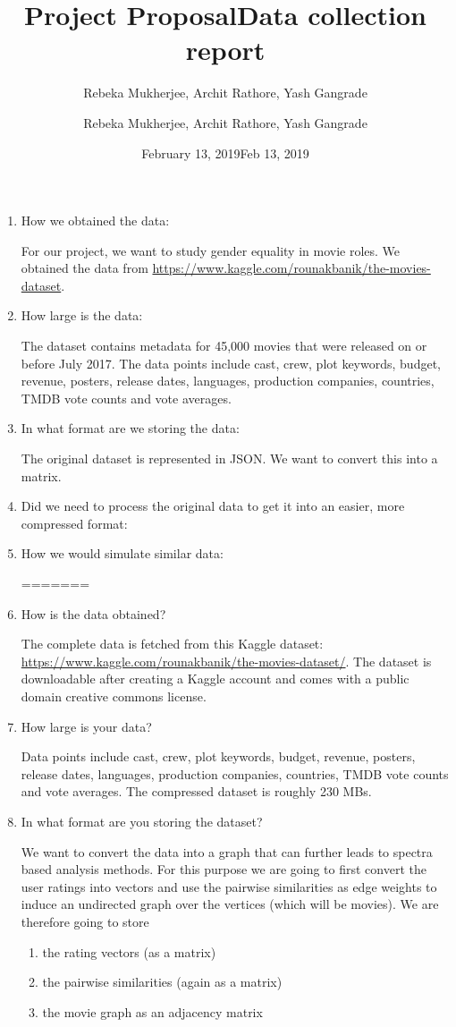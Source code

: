 \documentclass[11pt]{article}
\title{Project Proposal}
\author{Rebeka Mukherjee, Archit Rathore, Yash Gangrade}
\date{February 13, 2019}
\title{Data collection report}
\author{Rebeka Mukherjee, Archit Rathore, Yash Gangrade}
\date{Feb 13, 2019}
\begin{document}
\maketitle

\begin{enumerate}

<<<<<<< HEAD
\item How we obtained the data:

For our project, we want to study gender equality in movie roles. We obtained the data from \url{https://www.kaggle.com/rounakbanik/the-movies-dataset}.

\item How large is the data:

The dataset contains metadata for 45,000 movies that were released on or before July 2017. The data points include cast, crew, plot keywords, budget, revenue, posters, release dates, languages, production companies, countries, TMDB vote counts and vote averages.

\item In what format are we storing the data:

The original dataset is represented in JSON. We want to convert this into a matrix.


\item Did we need to process the original data to get it into an easier, more compressed format:


\item How we would simulate similar data:

=======
\item How is the data obtained?

The complete data is fetched from this Kaggle dataset: \url{https://www.kaggle.com/rounakbanik/the-movies-dataset/}. The dataset is downloadable after creating a Kaggle account and comes with a public domain creative commons license.

\item How large is your data?

Data points include cast, crew, plot keywords, budget, revenue, posters, release dates, languages, production companies, countries, TMDB vote counts and vote averages. The compressed dataset is roughly 230 MBs.

\item In what format are you storing the dataset?

We want to convert the data into a graph that can further leads to spectra based analysis methods. For this purpose we are going to first convert the user ratings into vectors and use the pairwise similarities as edge weights to induce an undirected graph over the vertices (which will be movies). We are therefore going to store
\begin{enumerate}
	\item the rating vectors (as a matrix)
	\item the pairwise similarities (again as a matrix)
	\item the movie graph as an adjacency matrix
\end{enumerate}


\end{enumerate}
\end{document}
